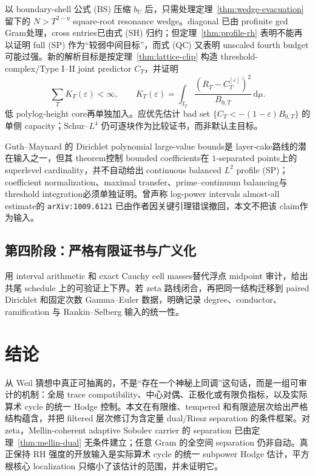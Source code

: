 \documentclass[UTF8,11pt,a4paper]{ctexart}
\theoremstyle{definition}
\theoremstyle{remark}
\newcommand{\dd}{\,\mathrm d}
\newcommand{\1}{\mathbf 1}
\begin{document}
以 boundary-shell 公式 (BS) 压缩 $b_U$ 后，只需处理定理~\ref{thm:wedge-evacuation} 留下的 $N>T^{2-\eta}$ square-root resonance wedge。diagonal 已由 profinite gcd Gram处理，cross entries已由式 (SH) 归约；但定理~\ref{thm:profile-rh} 表明不能再以证明 full (SP) 作为“较弱中间目标”，而式 (QC) 又表明 unscaled fourth budget可能过强。新的解析目标是按定理~\ref{thm:lattice-clip} 构造 threshold-complex/Type I--II joint predictor $C_T$，并证明
\[
 \sum_TK_T(\varepsilon)<\infty,\qquad
 K_T(\varepsilon)=\int_{I_T}
 \frac{(R_T-C_T^{[\varepsilon]})^2}{B_{0,T}}\dd\mu .
\]
低 polylog-height core再单独加入。应优先估计 bad set
$\{C_T<-(1-\varepsilon)B_{0,T}\}$ 的单侧 capacity；Schur--$L^4$ 仍可逐块作为比较证书，而非默认主目标。

Guth--Maynard 的 Dirichlet polynomial large-value bounds\cite{GuthMaynard}是 layer-cake路线的潜在输入之一，但其 theorem控制 bounded coefficients在 $1$-separated points上的 superlevel cardinality，并不自动给出 continuous balanced $L^2$ profile (SP)；coefficient normalization、maximal transfer、prime--continuum balancing与 threshold integration必须单独证明。曾声称 log-power intervals almost-all estimate的 \texttt{arXiv:1009.6121} 已由作者因关键引理错误撤回，本文不把该 claim作为输入。

\subsection{第四阶段：严格有限证书与广义化}

用 interval arithmetic 和 exact Cauchy cell masses替代浮点 midpoint 审计，给出共尾 schedule 上的可验证上下界。若 zeta 路线闭合，再把同一结构迁移到 paired Dirichlet 和固定次数 Gamma--Euler 数据，明确记录 degree、conductor、ramification 与 Rankin--Selberg 输入的统一性。

\section{结论}

从 Weil 猜想中真正可抽离的，不是“存在一个神秘上同调”这句话，而是一组可审计的机制：全局 trace compatibility、中心对偶、正极化或有限负指标，以及实际算术 cycle 的统一 Hodge 控制。本文在有限维、tempered 和有限迹层次给出严格结构蕴含，并把 filtered 层次修订为含定量 dual/Riesz separation 的条件框架。对 zeta，Mellin-coherent adaptive Sobolev carrier 的 separation 已由定理~\ref{thm:mellin-dual} 无条件建立；任意 Gram 的全空间 separation 仍非自动。真正保持 RH 强度的开放输入是实际算术 cycle 的统一 subpower Hodge 估计，平方根核心 localization 只缩小了该估计的范围，并未证明它。
\end{document}
